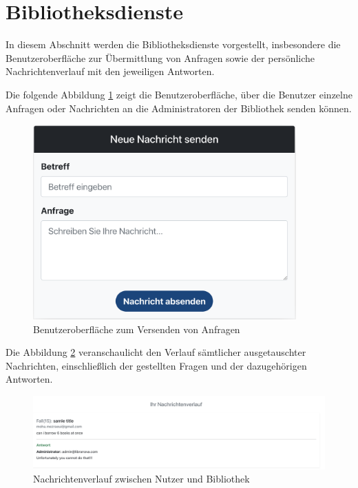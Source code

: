 \section{Bibliotheksdienste}
In diesem Abschnitt werden die Bibliotheksdienste vorgestellt, insbesondere die Benutzeroberfläche zur Übermittlung von Anfragen sowie der persönliche Nachrichtenverlauf mit den jeweiligen Antworten.

\noindent Die folgende Abbildung \ref{fig:Message-Send} zeigt die Benutzeroberfläche, über die Benutzer einzelne Anfragen oder Nachrichten an die Administratoren der Bibliothek senden können.

\begin{figure}[H]
	\centering
	\includegraphics[width=0.9\textwidth]{images/UI-screenshots/Message-Send.png}
	\caption{Benutzeroberfläche zum Versenden von Anfragen}
	\label{fig:Message-Send}
\end{figure}

\noindent Die Abbildung \ref{fig:Messages-History} veranschaulicht den Verlauf sämtlicher ausgetauschter Nachrichten, einschließlich der gestellten Fragen und der dazugehörigen Antworten.

\begin{figure}[H]
	\centering
	\includegraphics[width=1.0\textwidth]{images/UI-screenshots/Messages-History.png}
	\caption{Nachrichtenverlauf zwischen Nutzer und Bibliothek}
	\label{fig:Messages-History}
\end{figure}

